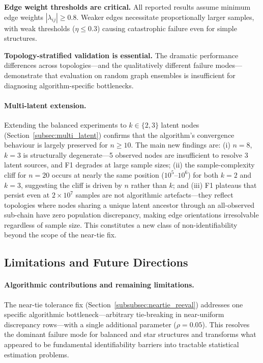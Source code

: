 \documentclass[11pt,a4paper]{article}
\numberwithin{equation}{section}
\begin{document}
\textbf{Edge weight thresholds are critical.}  All reported results assume minimum edge
weights $|\lambda_{ij}| \geq 0.8$.  Weaker edges necessitate proportionally larger
samples, with weak thresholds ($\eta \leq 0.3$) causing catastrophic failure even for
simple structures.

\textbf{Topology-stratified validation is essential.}  The dramatic performance
differences across topologies---and the qualitatively different failure modes---
demonstrate that evaluation on random graph ensembles is insufficient for diagnosing
algorithm-specific bottlenecks.

\paragraph{Multi-latent extension.}
Extending the balanced experiments to $k \in \{2,3\}$ latent nodes
(Section~\ref{subsec:multi_latent}) confirms that the algorithm's convergence
behaviour is largely preserved for $n \geq 10$.  The main new findings are: (i)
$n=8$, $k=3$ is structurally degenerate---5 observed nodes are insufficient to
resolve 3 latent sources, and F1 degrades at large sample sizes; (ii) the
sample-complexity cliff for $n=20$ occurs at nearly the same position ($10^5$--$10^6$)
for both $k=2$ and $k=3$, suggesting the cliff is driven by $n$ rather than $k$; and
(iii) F1 plateaus that persist even at $2 \times 10^7$ samples are not algorithmic
artefacts---they reflect topologies where nodes sharing a unique latent ancestor
through an all-observed sub-chain have zero population discrepancy, making edge
orientations irresolvable regardless of sample size.  This constitutes a new class of
non-identifiability beyond the scope of the near-tie fix.

\subsection{Limitations and Future Directions}

\paragraph{Algorithmic contributions and remaining limitations.}
The near-tie tolerance fix (Section~\ref{subsubsec:neartie_reeval}) addresses one
specific algorithmic bottleneck---arbitrary tie-breaking in near-uniform discrepancy
rows---with a single additional parameter ($\rho = 0.05$).  This resolves the dominant
failure mode for balanced and star structures and transforms what appeared to be
fundamental identifiability barriers into tractable statistical estimation problems.
\end{document}
